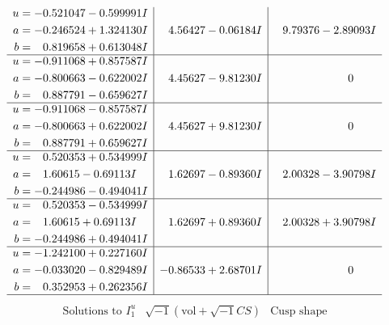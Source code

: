 \documentclass[1p]{elsarticle_modified}
\theoremstyle{definition}
\newcommand{\I}{\sqrt{-1}}
\begin{document}
$$\begin{array}{c|c|c}
\begin{aligned}
u &= -0.521047 - 0.599991 I \\
a &= -0.246524 + 1.324130 I \\
b &= \phantom{-}0.819658 + 0.613048 I\end{aligned}
 & \phantom{-}4.56427 - 0.06184 I & \phantom{-}9.79376 - 2.89093 I \\ \hline\begin{aligned}
u &= -0.911068 + 0.857587 I \\
a &= -0.800663 - 0.622002 I \\
b &= \phantom{-}0.887791 - 0.659627 I\end{aligned}
 & \phantom{-}4.45627 - 9.81230 I & \phantom{-0.000000 } 0 \\ \hline\begin{aligned}
u &= -0.911068 - 0.857587 I \\
a &= -0.800663 + 0.622002 I \\
b &= \phantom{-}0.887791 + 0.659627 I\end{aligned}
 & \phantom{-}4.45627 + 9.81230 I & \phantom{-0.000000 } 0 \\ \hline\begin{aligned}
u &= \phantom{-}0.520353 + 0.534999 I \\
a &= \phantom{-}1.60615 - 0.69113 I \\
b &= -0.244986 - 0.494041 I\end{aligned}
 & \phantom{-}1.62697 - 0.89360 I & \phantom{-}2.00328 - 3.90798 I \\ \hline\begin{aligned}
u &= \phantom{-}0.520353 - 0.534999 I \\
a &= \phantom{-}1.60615 + 0.69113 I \\
b &= -0.244986 + 0.494041 I\end{aligned}
 & \phantom{-}1.62697 + 0.89360 I & \phantom{-}2.00328 + 3.90798 I \\ \hline\begin{aligned}
u &= -1.242100 + 0.227160 I \\
a &= -0.033020 - 0.829489 I \\
b &= \phantom{-}0.352953 + 0.262356 I\end{aligned}
 & -0.86533 + 2.68701 I & \phantom{-0.000000 } 0\\
 \hline 
 \end{array}$$\newpage$$\begin{array}{c|c|c}  
\text{Solutions to }I^u_{1}& \I (\text{vol} + \sqrt{-1}CS) & \text{Cusp shape}\\

\end{array}$$
\end{document}
